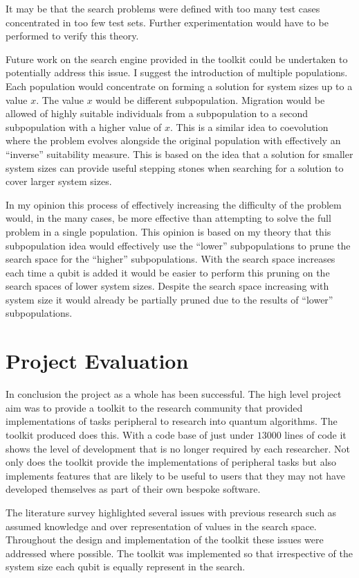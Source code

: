 It may be that the search problems were defined with too many test cases concentrated in too few test sets.
Further experimentation would have to be performed to verify this theory.

Future work on the search engine provided in the toolkit could be undertaken to potentially address this issue.
I suggest the introduction of multiple populations.
Each population would concentrate on forming a solution for system sizes up to a value $x$.
The value $x$ would be different subpopulation.
Migration would be allowed of highly suitable individuals from a subpopulation to a second subpopulation with a higher value of $x$.
This is a similar idea to coevolution where the problem evolves alongside the original population with effectively an ``inverse'' suitability measure.
This is based on the idea that a solution for smaller system sizes can provide useful stepping stones when searching for a solution to cover larger system sizes.

In my opinion this process of effectively increasing the difficulty of the problem would, in the many cases, be more effective than attempting to solve the full problem in a single population.
This opinion is based on my theory that this subpopulation idea would effectively use the ``lower'' subpopulations to prune the search space for the ``higher'' subpopulations.
With the search space increases each time a qubit is added it would be easier to perform this pruning on the search spaces of lower system sizes.
Despite the search space increasing with system size it would already be partially pruned due to the results of ``lower'' subpopulations.

\section{Project Evaluation}

In conclusion the project as a whole has been successful.
The high level project aim was to provide a toolkit to the research community that provided implementations of tasks peripheral to research into quantum algorithms.
The toolkit produced does this.
With a code base of just under $13000$ lines of code it shows the level of development that is no longer required by each researcher.
Not only does the toolkit provide the implementations of peripheral tasks but also implements features that are likely to be useful to users that they may not have developed themselves as part of their own bespoke software.

The literature survey highlighted several issues with previous research such as assumed knowledge and over representation of values in the search space.
Throughout the design and implementation of the toolkit these issues were addressed where possible.
The toolkit was implemented so that irrespective of the system size each qubit is equally represent in the search.


